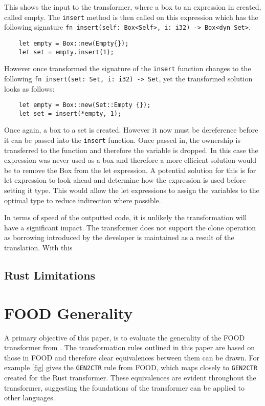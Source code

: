 \documentclass[ oneside,%
                    author={James Elgar},
                    degree={MEng},
                     title={Bidirectional transformer between functional and \\ object-oriented programming in Rust},
                  subtitle={}]{dissertation}
\newcommand{\rust}[1]{\texttt{#1}}
\begin{document}
\sloppy This shows the input to the transformer, where a box to an expression in created, called empty. The \rust{insert} method is then called on this expression which has the following signature \rust{fn insert(self: Box<Self>, i: i32) -> Box<dyn Set>}.
\begin{verbatim}
    let empty = Box::new(Empty{});
    let set = empty.insert(1);
\end{verbatim}

\sloppy However once transformed the signature of the \rust{insert} function changes to the following \rust{fn insert(set: Set, i: i32) -> Set}, yet the transformed solution looks as follows:

\begin{verbatim}
    let empty = Box::new(Set::Empty {});
    let set = insert(*empty, 1);
\end{verbatim}

Once again, a box to a set is created. However it now must be dereference before it can be passed into the \rust{insert} function. Once passed in, the ownership is transferred to the function and therefore the variable is dropped. In this case the expression was never used as a box and therefore a more efficient solution would be to remove the Box from the let expression. A potential solution for this is for let expression to look ahead and determine how the expression is used before setting it type. This would allow the let expressions to assign the variables to the optimal type to reduce indirection where possible. 

In terms of speed of the outputted code, it is unlikely the transformation will have a significant impact. The transformer does not support the clone operation as borrowing introduced by the developer is maintained as a result of the translation. With this 



\subsection{Rust Limitations}

\section{FOOD Generality} 

A primary objective of this paper, is to evaluate the generality of the FOOD transformer from \cite{food}.
The transformation rules outlined in this paper are based on those in FOOD and therefore clear equivalences between them can be drawn. For example \autoref{fig} gives the \verb|GEN2CTR| rule from FOOD, which maps closely to \verb|GEN2CTR| created for the Rust transformer. These equivalences are evident throughout the transformer, suggesting the foundations of the transformer can be applied to other languages.
\end{document}
